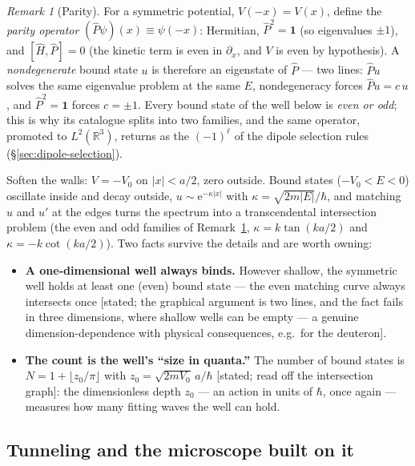 \documentclass[11pt]{article}
\theoremstyle{plain}
\theoremstyle{definition}
\theoremstyle{remark}
\newtheorem{remark}[theorem]{Remark}
\newcommand{\ee}{\mathrm{e}}
\newcommand{\R}{\mathbb{R}}
\newcommand{\op}[1]{\hat{#1}}
\newcommand{\idop}{\mathbf{1}}  %
\begin{document}
\begin{remark}[Parity]\label{rem:parity}
For a symmetric potential, $V(-x) = V(x)$, define the \emph{parity
operator} $(\op P\psi)(x) \equiv \psi(-x)$: Hermitian,
$\op P^2 = \idop$ (so eigenvalues $\pm1$), and $[\op H, \op P] = 0$
(the kinetic term is even in $\partial_x$, and $V$ is even by
hypothesis). A \emph{nondegenerate} bound state $u$ is therefore an
eigenstate of $\op P$ --- two lines: $\op P u$ solves the same
eigenvalue problem at the same $E$, nondegeneracy forces
$\op P u = c\,u$, and $\op P^2 = \idop$ forces $c = \pm1$. Every
bound state of the well below is \emph{even or odd}; this is why
its catalogue splits into two families, and the same operator,
promoted to $L^2(\R^3)$, returns as the $(-1)^\ell$ of the dipole
selection rules (\S\ref{sec:dipole-selection}).
\end{remark}

Soften the walls: $V = -V_0$ on $|x| < a/2$, zero outside. Bound
states ($-V_0 < E < 0$) oscillate inside and decay outside,
$u \sim \ee^{-\kappa|x|}$ with $\kappa = \sqrt{2m|E|}/\hbar$, and
matching $u$ and $u'$ at the edges turns the spectrum into a
transcendental intersection problem (the even and odd families of
Remark~\ref{rem:parity},
$\kappa = k\tan(ka/2)$ and $\kappa = -k\cot(ka/2)$). Two facts
survive the details and are worth owning:
\begin{itemize}
  \item \textbf{A one-dimensional well always binds.} However
  shallow, the symmetric well holds at least one (even) bound state
  --- the even matching curve always intersects once [stated; the
  graphical argument is two lines, and the fact fails in three
  dimensions, where shallow wells can be empty --- a genuine
  dimension-dependence with physical consequences, e.g.\ for the
  deuteron].
  \item \textbf{The count is the well's ``size in quanta.''} The
  number of bound states is
  $N = 1 + \lfloor z_0/\pi \rfloor$ with
  $z_0 = \sqrt{2mV_0}\,a/\hbar$ [stated; read off the intersection
  graph]: the dimensionless depth $z_0$ --- an action in units of
  $\hbar$, once again --- measures how many fitting waves the well
  can hold.
\end{itemize}

\subsection{Tunneling and the microscope built on it}
\label{sec:tunneling}
\end{document}
